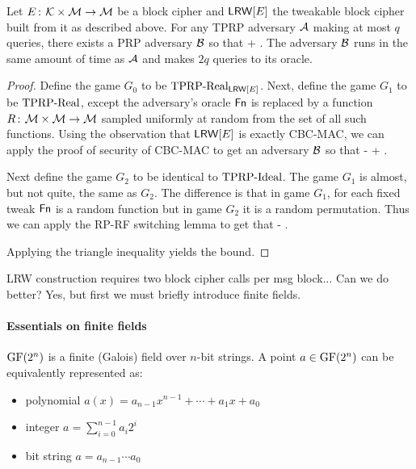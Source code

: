 \begin{theorem}
  Let $E{{\kern .05em}\colon{\kern .05em}}{\cal K}\times{\cal M}\rightarrow{\cal M}$ be a block cipher and $\mathsf{LRW}[E]$ the tweakable block cipher built from it as described above. For any TPRP adversary ${\mathcal A}$ making at most $q$ queries, there exists a PRP adversary ${\mathcal B}$ so that
  \bnm
  \AdvTPRP{\lrw[E]}{\advA} \leq {} + \; .
  \enm
  The adversary ${\mathcal B}$ runs in the same amount of time as ${\mathcal A}$ and makes $2q$ queries to its oracle.
\end{theorem}
\begin{proof}
    Define the game $G_0$ to be $\text{TPRP-Real}_{\mathsf{LRW}[E]}$. Next, define the game $G_1$ to be $\text{TPRP-Real}$, except the adversary's oracle $\mathsf{Fn}$ is replaced by a function $R{{\kern .05em}\colon{\kern .05em}}{\cal M}\times{\cal M}\rightarrow{\cal M}$ sampled uniformly at random from the set of all such functions. Using the observation that $\mathsf{LRW}[E]$ is exactly CBC-MAC, we can apply the proof of security of CBC-MAC to get an adversary ${\mathcal B}$ so that
  \bnm
  \left\lvert{}-\right\rvert \leq {} + \; .
  \enm

  Next define the game $G_2$ to be identical to $\text{TPRP-Ideal}$. The game $G_1$ is almost, but not quite, the same as $G_2$. The difference is that in game $G_1$, for each fixed tweak $\mathsf{Fn}$ is a random function but in game $G_2$ it is a random permutation. Thus we can apply the RP-RF switching lemma to get that
  \bnm
  \left\lvert{}-\right\rvert \leq {}\; .
  \enm

  Applying the triangle inequality yields the bound.\hfill\qedsym
\end{proof}

LRW construction requires two block cipher calls per msg block... Can we do better? Yes, but first we must briefly introduce finite fields.

\paragraph{Essentials on finite fields} $\text{GF}(2^{n})$ is a finite (Galois) field over $n$-bit strings. A point $a \in \text{GF}(2^{n})$ can be equivalently represented as:
\begin{itemize}
\item polynomial $a(x) = a_{n-1}x^{n-1} + \cdots + a_1 x + a_0$
\item integer $a = \sum\limits_{i=0}^{n-1} a_i 2^i$
\item bit string $a= a_{n-1}\cdots a_0$
\end{itemize}

